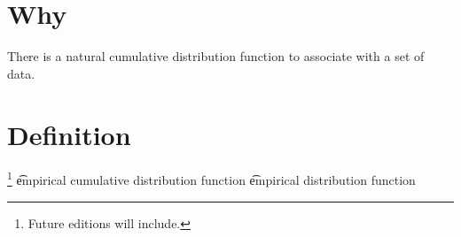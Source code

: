 
\section*{Why}

There is a natural cumulative distribution function to associate with a set of data.

\section*{Definition}
\footnote{Future editions will include.}
\t{empirical cumulative distribution function} \t{empirical distribution function}
\blankpage